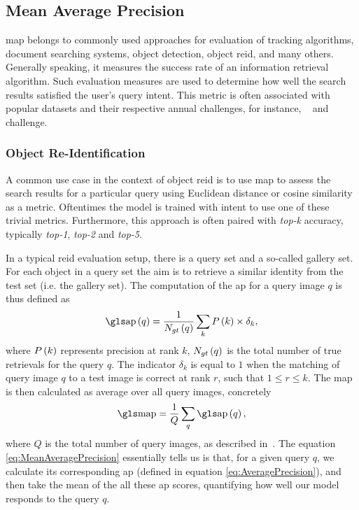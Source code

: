 \subsection{Mean Average Precision}
\label{ssec:MeanAveragePrecision}


\Gls{map} belongs to commonly used approaches for evaluation of tracking algorithms, document searching systems, object detection, object \gls{reid}, and many others. Generally speaking, it measures the success rate of an information retrieval algorithm. Such evaluation measures are used to determine how well the search results satisfied the user's query intent. This metric is often associated with popular datasets and their respective annual challenges, for instance, \pascalvoc{}~\cite{everingham2010pascalvoc} and \mscoco{}~\cite{lin2014mscoco} challenge.

\subsubsection{Object Re-Identification}
\label{sssec:ObjectReIdentification}

A common use case in the context of object \gls{reid} is to use \gls{map} to assess the search results for a particular query using Euclidean distance or cosine similarity as a metric. Oftentimes the model is trained with intent to use one of these trivial metrics. Furthermore, this approach is often paired with \emph{top-k} accuracy, typically \emph{top-1}, \emph{top-2} and \emph{top-5}.

In a typical \gls{reid} evaluation setup, there is a query set and a so-called gallery set. For each object in a query set the aim is to retrieve a similar identity from the test set (i.e. the gallery set). The computation of the \gls{ap} for a query image $q$ is thus defined as
\begin{equation}
    \label{eq:AveragePrecision}
    \func{\AP}{q} = \frac{1}{\func{N_{gt}}{q}} \sum_{k} \func{P}{k} \times {\delta}_k,
\end{equation}
where ${P} \left( k \right)$ represents precision at rank $k$, ${N_{gt}} \left( q \right)$ is the total number of true retrievals for the query $q$. The indicator ${\delta}_k$ is equal to $1$ when the matching of query image $q$ to a test image is correct at rank $r$, such that $1 \leq r \leq k$. The \gls{map} is then calculated as average over all query images, concretely
\begin{equation}
    \label{eq:MeanAveragePrecision}
    \MAP = \frac{1}{Q} \sum_q \func{\AP}{q},
\end{equation}
where $Q$ is the total number of query images, as described in~\cite{kuma2019vehiclereid}. The equation \ref{eq:MeanAveragePrecision} essentially tells us is that, for a given query $q$, we calculate its corresponding \gls{ap} (defined in equation \ref{eq:AveragePrecision}), and then take the mean of the all these \gls{ap} scores, quantifying how well our model responds to the query $q$.

